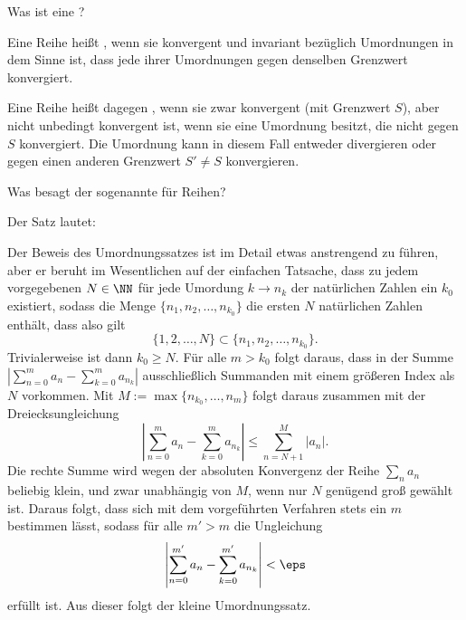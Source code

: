 \begin{frage}\label{02_unb}
  Was ist eine ?
\end{frage}

\begin{antwort}
  Eine Reihe heißt , wenn sie konvergent und 
  invariant bezüglich Umordnungen in dem Sinne ist, dass jede ihrer 
  Umordnungen gegen denselben Grenzwert konvergiert.

  Eine Reihe heißt dagegen , wenn sie zwar 
  konvergent (mit Grenzwert $S$), 
  aber nicht unbedingt konvergent ist, {\dasheisst} wenn sie eine 
  Umordnung besitzt, die nicht gegen $S$ konvergiert. Die Umordnung 
  kann in diesem Fall entweder divergieren oder gegen einen anderen 
  Grenzwert $S'\not= S$ konvergieren. 
  \AntEnd
\end{antwort}

\begin{frage}\label{02_klum}
  Was besagt der sogenannte  für Reihen?
\end{frage}

\begin{antwort}
  Der Satz lautet:

  \medskip\noindent 

  \medskip\noindent
  Der Beweis des Umordnungssatzes 
  ist im Detail etwas anstrengend zu führen, 
  aber er beruht im Wesentlichen auf der einfachen Tatsache, 
  dass zu jedem vorgegebenen $N\in\NN$ für jede Umordung 
  $k\to n_k$ der natürlichen Zahlen ein $k_0$ existiert, sodass die Menge 
  $\{ n_1, n_2, \ldots , n_{k_0} \}$ die ersten $N$ natürlichen 
  Zahlen enthält, dass also gilt
  \[
  \{ 1, 2, \ldots, N \} \subset \{ n_1, n_2, \ldots , n_{k_0} \}.  
  \]
  Trivialerweise ist dann $k_0\ge N$. Für alle $m>k_0$ folgt daraus, dass 
  in der Summe $\left|  \sum_{n=0}^m a_n - \sum_{k=0}^m a_{n_k} \right|$ 
  ausschließlich Summanden mit einem größeren Index als $N$ vorkommen. 
  Mit $M:=\max\{ n_{k_0},\ldots , n_m \}$ folgt daraus zusammen 
  mit der Dreiecksungleichung
  \[
  \left|  \sum_{n=0}^m a_n - \sum_{k=0}^m a_{n_k} \right| \le 
  \sum_{n=N+1}^M |a_n|.
  \] 
  Die rechte Summe wird wegen der absoluten Konvergenz der Reihe $\sum_n a_n$ 
  beliebig klein, und zwar unabhängig von $M$, wenn nur $N$ 
  genügend groß gewählt ist. Daraus folgt, dass sich mit dem vorgeführten 
  Verfahren stets ein $m$ bestimmen 
  lässt, sodass für alle $m'>m$ die Ungleichung  
  \[
  \left|  \sum_{n=0}^{m'} a_n - \sum_{k=0}^{m'} a_{n_k} \right| < \eps
  \] 
  erfüllt ist. Aus dieser folgt der kleine Umordnungssatz.
  \AntEnd
\end{antwort}

